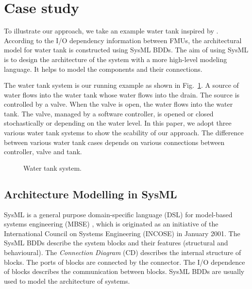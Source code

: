 
\section{Case study}
\label{sec:sysml}
To illustrate our approach, we take an example water tank inspired by \cite{AmalioPCW16}. According to the I/O dependency information between FMUs, the architectural model for water tank is constructed using SysML BDDs. The aim of using SysML is to design the architecture of the system with a more high-level modeling language. It helps to model the components and their connections.

The water tank system is our running example as shown in Fig.~\ref{tankfig}. A source of water flows into the water tank whose water flows into the drain. The source is controlled by a valve. When the valve is open, the water flows into the water tank. The valve, managed by a software controller, is opened or closed stochastically or depending on the water level. In this paper, we adopt three various water tank systems to show the scability of our approach. The difference between various water tank cases depends on various connections between controller, valve and tank. 
\begin{figure}[htbp]
	\caption{Water tank system.}
	\label{tankfig}
\end{figure} 
\subsection{Architecture Modelling in SysML}
SysML is a general purpose domain-specific language (DSL) \cite{SemerathBHSV17} for model-based systems engineering (MBSE) \cite{Dori16}, which is originated as an initiative of the International Council on Systems Engineering (INCOSE) \cite{Pepper2015International} in January 2001. The SysML BDDs describe the system blocks and their features (structural and behavioural). The \textit{Connection Diagram} (CD) describes the internal structure of blocks. The ports of blocks are connected by the connector. The I/O dependence of blocks describes the communication between blocks. SysML BDDs are usually used to model the architecture of systems.

